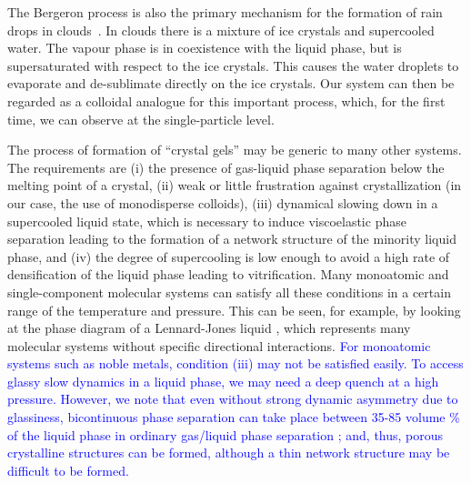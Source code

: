 \documentclass[preprint,amsmath,amssymb,superscriptaddress]{revtex4-1}
\begin{document}
The Bergeron process is also the primary mechanism for the formation of rain drops in clouds~\cite{glickman2000glossary,morrison2012resilience}.
In clouds there is a mixture of ice crystals and supercooled water. The vapour phase is in coexistence with the liquid phase, but is supersaturated
with respect to the ice crystals. This causes the water droplets to evaporate and de-sublimate directly on the ice crystals. Our system can then
be regarded as a colloidal analogue for this important process, which, for the first time, we can observe at the single-particle level.  

The process of formation of ``crystal gels'' may be generic to many other 
systems. The requirements are (i) the presence of gas-liquid phase separation below the melting point of a crystal, (ii) 
weak or little frustration against crystallization (in our case, the use of monodisperse colloids), 
(iii) dynamical slowing down in a supercooled liquid state, which is necessary to induce viscoelastic phase separation leading to the formation 
of a network structure of the minority liquid phase, and (iv) the degree of supercooling is low enough to avoid a high rate of densification of the liquid phase 
leading to vitrification.  
Many monoatomic and single-component molecular systems can satisfy all these conditions in a certain range of the temperature and pressure. 
This can be seen, for example, by looking at the phase diagram of a Lennard-Jones liquid \cite{lodge1997brownian}, which represents many molecular systems 
without specific directional interactions. \textcolor{blue}{For monoatomic systems such as noble metals, condition (iii) may not be satisfied easily. 
To access glassy slow dynamics in a liquid phase, we may need a deep quench at a high pressure. However, we note that even without strong dynamic asymmetry 
due to glassiness, bicontinuous phase separation can take place between 35-85 volume \% of the liquid phase in ordinary gas/liquid phase separation \cite{Onuki2002}; 
and, thus, porous crystalline structures can be formed, although a thin network structure may be difficult to be formed.}
\end{document}
